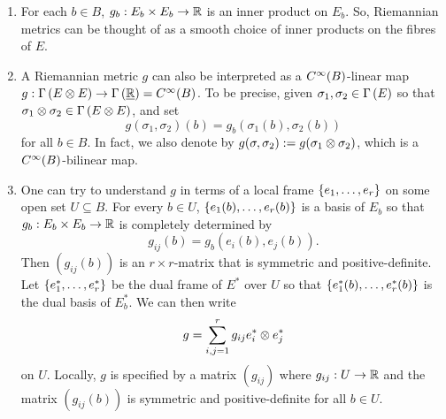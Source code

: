 \documentclass[main.tex]{subfiles}
\begin{document}
\begin{rmk}
  \begin{enumerate}

    \item For each $b \in B$, $g_b: E_b \times E_b \to \mathbb{R}$ is an inner product on $E_b$. So, Riemannian metrics can be thought of as a smooth choice of inner products on the fibres of $E$.

    \item A Riemannian metric $g$ can also be interpreted as a $C^\infty(B)$-linear map $g : \Gamma\left( E \otimes E \right) \to \Gamma\left( \underline{\mathbb{R}} \right) = C^\infty(B)$. To be precise, given $\sigma_1, \sigma_2 \in \Gamma\left( E \right)$ so that $\sigma_1 \otimes \sigma_2 \in \Gamma\left( E \otimes E \right)$, and set
    \[
    g(\sigma_1, \sigma_2)(b) = g_b(\sigma_1(b), \sigma_2(b))
    \] for all $b \in B$. In fact, we also denote by $g(\sigma, \sigma_2) := g(\sigma_1 \otimes \sigma_2)$, which is a $C^\infty(B)$-bilinear map.

    \item One can try to understand $g$ in terms of a local frame $\left\{e_1,\dots, e_r\right\}$ on some open set $U \subseteq B$. For every $b \in U$, $\left\{e_1(b), \dots, e_r(b)\right\}$ is a basis of $E_b$ so that $g_b: E_b \times E_b \to \mathbb{R}$ is completely determined by
    \[
    g_{ij}(b) = g_b(e_i(b), e_j(b)).
    \]
    Then $(g_{ij}(b))$ is an $r\times r$-matrix that is symmetric and positive-definite. Let $\left\{e_1^*, \dots, e_r^*\right\}$ be the dual frame of $E^*$ over $U$ so that $\left\{e_1^*(b), \dots, e_r^*(b)\right\}$ is the dual basis of $E_b^*$. We can then write
    \[
    g = \sum_{i,j=1}^r g_{ij} e^*_i \otimes e_j^*
    \] on $U$. Locally, $g$ is specified by a matrix $(g_{ij})$ where $g_{ij}: U \to \mathbb{R}$ and the matrix $(g_{ij}(b))$ is symmetric and positive-definite for all $b \in U$.

  \end{enumerate}
\end{rmk}

\end{document}
